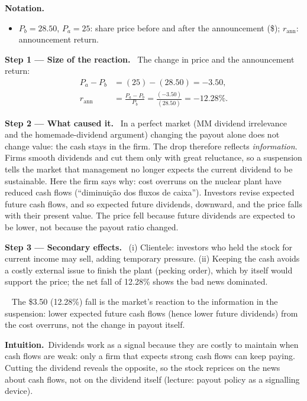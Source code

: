 \documentclass[11pt,a4paper]{article}
\newcommand{\notation}{\par\noindent\textbf{Notation.}}
\newcommand{\step}[2]{\par\medskip\noindent\textbf{Step #1 --- #2.}~}
\newcommand{\intuition}{\par\medskip\noindent\textbf{Intuition.}~}
\newcommand{\pt}{\foreignlanguage{brazilian}}
\newcommand{\answer}[1]{\par\smallskip\noindent\fbox{\textbf{Answer #1.}}~}
\begin{document}
\notation
\begin{itemize}
  \item $P_b=28.50$, $P_a=25$: share price before and after the announcement (\$); $r_{\text{ann}}$: announcement return.
\end{itemize}

\step{1}{Size of the reaction} The change in price and the announcement return:
\begin{align}
  P_a-P_b &= (25)-(28.50) = -3.50, \nonumber\\
  r_{\text{ann}} &= \frac{P_a-P_b}{P_b} = \frac{(-3.50)}{(28.50)} = -12.28\%. \label{t3e5-r}
\end{align}

\step{2}{What caused it} In a perfect market (MM dividend irrelevance and the homemade-dividend argument) changing the payout alone does not change value: the cash stays in the firm. The drop therefore reflects \emph{information}. Firms smooth dividends and cut them only with great reluctance, so a suspension tells the market that management no longer expects the current dividend to be sustainable. Here the firm says why: cost overruns on the nuclear plant have reduced cash flows (\pt{``diminui\c{c}\~ao dos fluxos de caixa''}). Investors revise expected future cash flows, and so expected future dividends, downward, and the price falls with their present value. The price fell because future dividends are expected to be lower, not because the payout ratio changed.

\step{3}{Secondary effects} (i) Clientele: investors who held the stock for current income may sell, adding temporary pressure. (ii) Keeping the cash avoids a costly external issue to finish the plant (pecking order), which by itself would support the price; the net fall of 12.28\% shows the bad news dominated.

\answer{(a)} The \$3.50 (12.28\%) fall is the market's reaction to the information in the suspension: lower expected future cash flows (hence lower future dividends) from the cost overruns, not the change in payout itself.

\intuition Dividends work as a signal because they are costly to maintain when cash flows are weak: only a firm that expects strong cash flows can keep paying. Cutting the dividend reveals the opposite, so the stock reprices on the news about cash flows, not on the dividend itself (lecture: payout policy as a signalling device).
\end{document}
